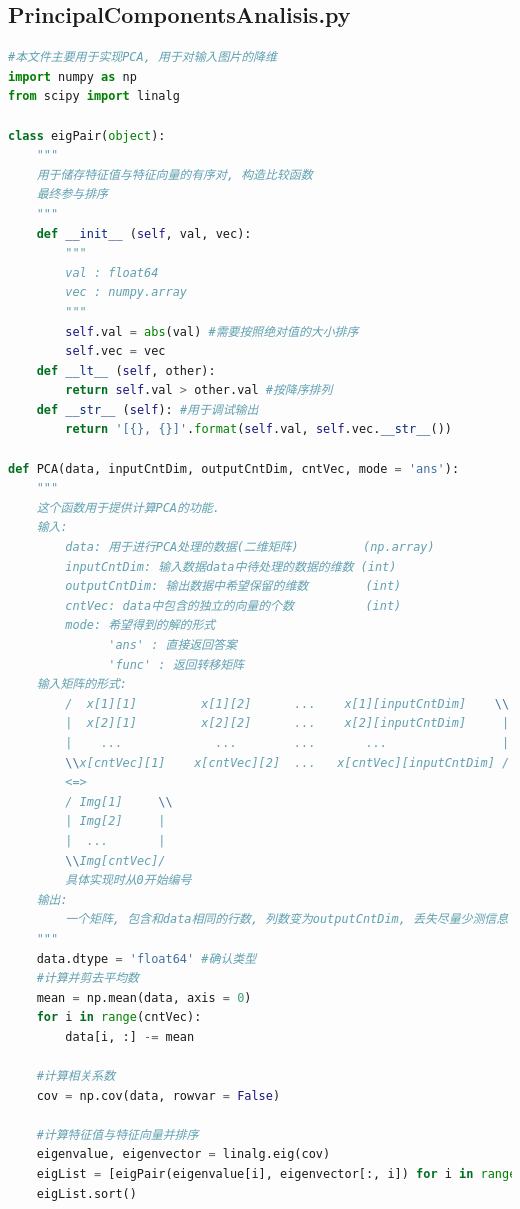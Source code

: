 \documentclass[fleqn,10pt]{SelfArx} %
\begin{document}
\subsection*{PrincipalComponentsAnalisis.py}
\begin{lstlisting}[language=python]
#本文件主要用于实现PCA, 用于对输入图片的降维
import numpy as np
from scipy import linalg

class eigPair(object):
    """
    用于储存特征值与特征向量的有序对, 构造比较函数
    最终参与排序
    """
    def __init__ (self, val, vec):
        """
        val : float64
        vec : numpy.array
        """
        self.val = abs(val) #需要按照绝对值的大小排序
        self.vec = vec
    def __lt__ (self, other):
        return self.val > other.val #按降序排列
    def __str__ (self): #用于调试输出
        return '[{}, {}]'.format(self.val, self.vec.__str__())

def PCA(data, inputCntDim, outputCntDim, cntVec, mode = 'ans'):
    """
    这个函数用于提供计算PCA的功能.
    输入: 
        data: 用于进行PCA处理的数据(二维矩阵)         (np.array)
        inputCntDim: 输入数据data中待处理的数据的维数 (int)
        outputCntDim: 输出数据中希望保留的维数        (int)
        cntVec: data中包含的独立的向量的个数          (int)
        mode: 希望得到的解的形式
              'ans' : 直接返回答案
              'func' : 返回转移矩阵
    输入矩阵的形式:
        /  x[1][1]         x[1][2]      ...    x[1][inputCntDim]    \\
        |  x[2][1]         x[2][2]      ...    x[2][inputCntDim]     |
        |    ...             ...        ...       ...                |
        \\x[cntVec][1]    x[cntVec][2]  ...   x[cntVec][inputCntDim] /
        <=>
        / Img[1]     \\
        | Img[2]     |
        |  ...       |
        \\Img[cntVec]/
        具体实现时从0开始编号
    输出:
        一个矩阵, 包含和data相同的行数, 列数变为outputCntDim, 丢失尽量少测信息
    """
    data.dtype = 'float64' #确认类型
    #计算并剪去平均数
    mean = np.mean(data, axis = 0)
    for i in range(cntVec):
        data[i, :] -= mean

    #计算相关系数
    cov = np.cov(data, rowvar = False)
    
    #计算特征值与特征向量并排序
    eigenvalue, eigenvector = linalg.eig(cov)
    eigList = [eigPair(eigenvalue[i], eigenvector[:, i]) for i in range(inputCntDim)]
    eigList.sort()


\end{lstlisting}
\end{document}
